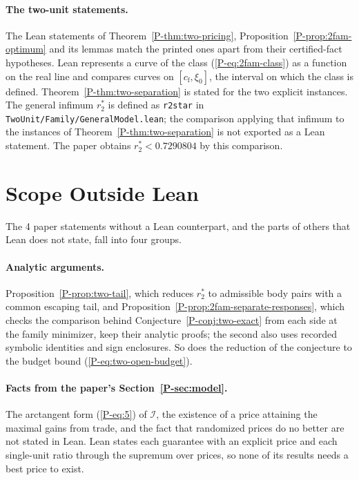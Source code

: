 \documentclass[11pt]{article}
\newcommand{\pref}[1]{\ref*{P-#1}}
\newcommand{\peqref}[1]{(\ref*{P-#1})}
\newcommand{\lean}[1]{\begingroup\def\_{\textunderscore\allowbreak}\texttt{\small #1}\endgroup}
\begin{document}
\paragraph{The two-unit statements.}
The Lean statements of Theorem~\pref{thm:two-pricing},
Proposition~\pref{prop:2fam-optimum} and its lemmas match the printed ones
apart from their certified-fact hypotheses. Lean represents a curve of the
class \peqref{eq:2fam-class} as a function on the real line and compares
curves on $[c_{\mathrm f},\xi_0]$, the interval on which the class is
defined. Theorem~\pref{thm:two-separation} is stated for the two explicit
instances. The general infimum $r_2^*$ is defined as
\lean{r2star} in \lean{TwoUnit/Family/GeneralModel.lean}; the
comparison applying that infimum to the instances of
Theorem~\pref{thm:two-separation} is not exported as a Lean
statement. The paper obtains $r_2^*<0.7290804$ by this comparison.

\section{Scope Outside Lean}
\label{s:outside}

The 4 paper statements without a Lean counterpart, and the parts of others
that Lean does not state, fall into four groups.

\paragraph{Analytic arguments.}
Proposition~\pref{prop:two-tail}, which reduces $r_2^*$ to admissible body
pairs with a common escaping tail, and
Proposition~\pref{prop:2fam-separate-responses}, which checks the
comparison behind Conjecture~\pref{conj:two-exact} from each side at the
family minimizer, keep their analytic proofs; the second also uses recorded
symbolic identities and sign enclosures. So does the reduction of the
conjecture to the budget bound \peqref{eq:two-open-budget}.

\paragraph{Facts from the paper's Section~\pref{sec:model}.}
The arctangent form \peqref{eq:5} of $\mathcal I$, the existence of a price
attaining the maximal gains from trade, and the fact that randomized prices
do no better are not stated in Lean. Lean states each guarantee with an
explicit price and each single-unit ratio through the supremum over prices,
so none of its results needs a best price to exist.
\end{document}
